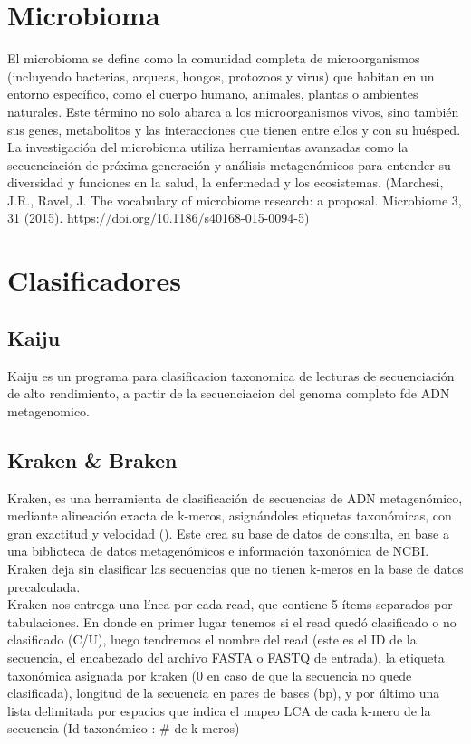 \section{Microbioma}

El microbioma se define como la comunidad completa de microorganismos (incluyendo bacterias, arqueas, hongos, protozoos y virus) que habitan en un entorno específico, como el cuerpo humano, animales, plantas o ambientes naturales. Este término no solo abarca a los microorganismos vivos, sino también sus genes, metabolitos y las interacciones que tienen entre ellos y con su huésped. La investigación del microbioma utiliza herramientas avanzadas como la secuenciación de próxima generación y análisis metagenómicos para entender su diversidad y funciones en la salud, la enfermedad y los ecosistemas. (Marchesi, J.R., Ravel, J. The vocabulary of microbiome research: a proposal. Microbiome 3, 31 (2015). https://doi.org/10.1186/s40168-015-0094-5) \\

\section{Clasificadores}

\subsection{Kaiju}

Kaiju es un programa para clasificacion taxonomica de lecturas de secuenciación de alto rendimiento,  a partir de la secuenciacion del genoma completo fde ADN metagenomico. \\

\subsection{Kraken \& Braken}

Kraken, es una herramienta de clasificación de secuencias de ADN metagenómico, mediante alineación exacta de k-meros, asignándoles etiquetas taxonómicas, con gran exactitud y velocidad (\cite{wood2014kraken}).  Este crea su base de datos de consulta, en base a una biblioteca de datos metagenómicos e información taxonómica de NCBI. \\

Kraken deja sin clasificar las secuencias que no tienen k-meros en la base de datos precalculada. \\

Kraken nos entrega una línea por cada read, que contiene 5 ítems separados por tabulaciones. En donde en primer lugar tenemos si el read quedó clasificado o no clasificado (C/U), luego tendremos el nombre del read (este es el ID de la secuencia, el encabezado del archivo FASTA o FASTQ de entrada), la etiqueta taxonómica asignada por kraken (0 en caso de que la secuencia no quede clasificada), longitud de la secuencia en pares de bases (bp), y por último una lista delimitada por espacios que indica el mapeo LCA de cada k-mero de la secuencia (Id taxonómico : \# de k-meros) \\

